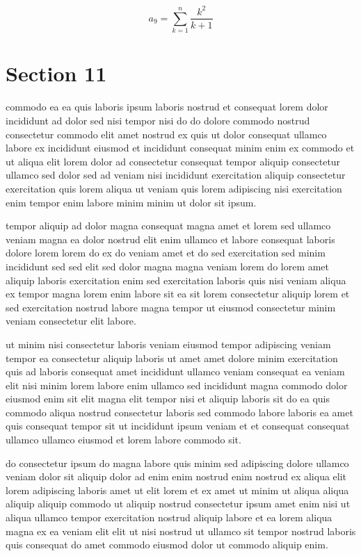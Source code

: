 \documentclass{article}
\begin{document}
\begin{equation} a_{9} = \sum_{k=1}^{n} \frac{k^2}{k+1} \end{equation}
\section{Section 11}
commodo ea ea quis laboris ipsum laboris nostrud et consequat lorem dolor incididunt ad dolor sed nisi tempor nisi do do dolore commodo nostrud consectetur commodo elit amet nostrud ex quis ut dolor consequat ullamco labore ex incididunt eiusmod et incididunt consequat minim enim ex commodo et ut aliqua elit lorem dolor ad consectetur consequat tempor aliquip consectetur ullamco sed dolor sed ad veniam nisi incididunt exercitation aliquip consectetur exercitation quis lorem aliqua ut veniam quis lorem adipiscing nisi exercitation enim tempor enim labore minim minim ut dolor sit ipsum.

tempor aliquip ad dolor magna consequat magna amet et lorem sed ullamco veniam magna ea dolor nostrud elit enim ullamco et labore consequat laboris dolore lorem lorem do ex do veniam amet et do sed exercitation sed minim incididunt sed sed elit sed dolor magna magna veniam lorem do lorem amet aliquip laboris exercitation enim sed exercitation laboris quis nisi veniam aliqua ex tempor magna lorem enim labore sit ea sit lorem consectetur aliquip lorem et sed exercitation nostrud labore magna tempor ut eiusmod consectetur minim veniam consectetur elit labore.

ut minim nisi consectetur laboris veniam eiusmod tempor adipiscing veniam tempor ea consectetur aliquip laboris ut amet amet dolore minim exercitation quis ad laboris consequat amet incididunt ullamco veniam consequat ea veniam elit nisi minim lorem labore enim ullamco sed incididunt magna commodo dolor eiusmod enim sit elit magna elit tempor nisi et aliquip laboris sit do ea quis commodo aliqua nostrud consectetur laboris sed commodo labore laboris ea amet quis consequat tempor sit ut incididunt ipsum veniam et et consequat consequat ullamco ullamco eiusmod et lorem labore commodo sit.

do consectetur ipsum do magna labore quis minim sed adipiscing dolore ullamco veniam dolor sit aliquip dolor ad enim enim nostrud enim nostrud ex aliqua elit lorem adipiscing laboris amet ut elit lorem et ex amet ut minim ut aliqua aliqua aliquip aliquip commodo ut aliquip nostrud consectetur ipsum amet enim nisi ut aliqua ullamco tempor exercitation nostrud aliquip labore et ea lorem aliqua magna ex ea veniam elit elit ut nisi nostrud ut ullamco sit tempor nostrud laboris quis consequat do amet commodo eiusmod dolor ut commodo aliquip enim.
\end{document}
